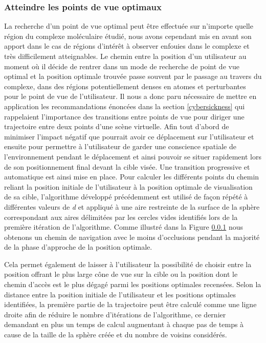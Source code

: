 \subsubsection{Atteindre les points de vue optimaux}

La recherche d'un point de vue optimal peut être effectuée sur n'importe quelle région du complexe moléculaire étudié, nous avons cependant mis en avant son apport dans le cas de régions d'intérêt à observer enfouies dans le complexe et très difficilement atteignables. Le chemin entre la position d'un utilisateur au moment où il décide de rentrer dans un mode de recherche de point de vue optimal et la position optimale trouvée passe souvent par le passage au travers du complexe, dans des régions potentiellement denses en atomes et perturbantes pour le point de vue de l'utilisateur. Il nous a donc paru nécessaire de mettre en application les recommandations énoncées dans la section \ref{cybersickness} qui rappelaient l'importance des transitions entre points de vue pour diriger une trajectoire entre deux points d'une scène virtuelle. Afin tout d'abord de minimiser l'impact négatif que pourrait avoir ce déplacement sur l'utilisateur et ensuite pour permettre à l'utilisateur de garder une conscience spatiale de l'environnement pendant le déplacement et ainsi pouvoir se situer rapidement lors de son positionnement final devant la cible visée.
Une transition progressive et automatique est ainsi mise en place. Pour calculer les différents points du chemin reliant la position initiale de l'utilisateur à la position optimale de visualisation de sa cible, l'algorithme développé précédemment est utilisé de façon répété à différentes valeurs de \textit{d} et appliqué à une aire restreinte de la surface de la sphère correspondant aux aires délimitées par les cercles vides identifiés lors de la première itération de l'algorithme. Comme illustré dans la Figure \ref{} nous obtenons un chemin de navigation avec le moins d'occlusions pendant la majorité de la phase d'approche de la position optimale.

Cela permet également de laisser à l'utilisateur la possibilité de choisir entre la position offrant le plus large cône de vue sur la cible ou la position dont le chemin d'accès est le plus dégagé parmi les positions optimales recensées. Selon la distance entre la position initiale de l'utilisateur et les positions optimales identifiées, la première partie de la trajectoire peut être calculé comme une ligne droite afin de réduire le nombre d'itérations de l'algorithme, ce dernier demandant en plus un temps de calcul augmentant à chaque pas de temps à cause de la taille de la sphère créée et du nombre de voisins considérés.

